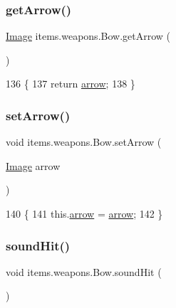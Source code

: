 \subsubsection{\texorpdfstring{get\+Arrow()}{getArrow()}}
{\footnotesize\ttfamily \mbox{\hyperlink{classorg_1_1newdawn_1_1slick_1_1_image}{Image}} items.\+weapons.\+Bow.\+get\+Arrow (\begin{DoxyParamCaption}{ }\end{DoxyParamCaption})\hspace{0.3cm}{\ttfamily [inline]}}


\begin{DoxyCode}
136                             \{
137         \textcolor{keywordflow}{return} \mbox{\hyperlink{classitems_1_1weapons_1_1_bow_a6bb996a10bf375e8a93d452fb7ee70a9}{arrow}};
138     \}
\end{DoxyCode}
\mbox{\label{classitems_1_1weapons_1_1_bow_a80b33c84308d1578fbc6b436a86a6694}} 
\subsubsection{\texorpdfstring{set\+Arrow()}{setArrow()}}
{\footnotesize\ttfamily void items.\+weapons.\+Bow.\+set\+Arrow (\begin{DoxyParamCaption}\item[{\mbox{\hyperlink{classorg_1_1newdawn_1_1slick_1_1_image}{Image}}}]{arrow }\end{DoxyParamCaption})\hspace{0.3cm}{\ttfamily [inline]}}


\begin{DoxyCode}
140                                       \{
141         this.\mbox{\hyperlink{classitems_1_1weapons_1_1_bow_a6bb996a10bf375e8a93d452fb7ee70a9}{arrow}} = \mbox{\hyperlink{classitems_1_1weapons_1_1_bow_a6bb996a10bf375e8a93d452fb7ee70a9}{arrow}};
142     \}
\end{DoxyCode}
\mbox{\label{classitems_1_1weapons_1_1_bow_a05eec2be368f97db02fa22296632b954}} 
\subsubsection{\texorpdfstring{sound\+Hit()}{soundHit()}}
{\footnotesize\ttfamily void items.\+weapons.\+Bow.\+sound\+Hit (\begin{DoxyParamCaption}{ }\end{DoxyParamCaption})\hspace{0.3cm}{\ttfamily [inline]}}


